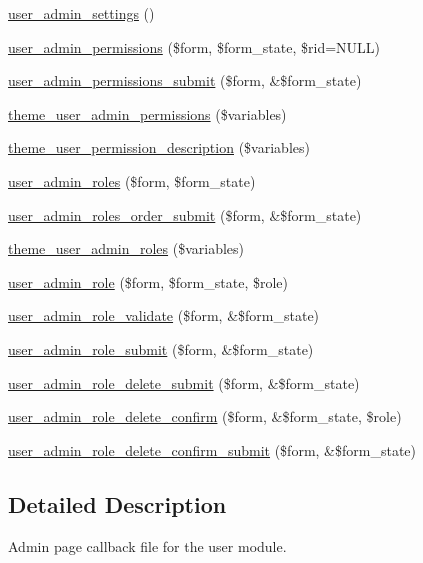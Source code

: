 \begin{DoxyCompactItemize}
\item 
\hyperlink{group__forms_ga8cb1bc70278e0e628fd17c2ec8353bd1}{user\_\-admin\_\-settings} ()
\item 
\hyperlink{group__forms_gabcf8ce0bd54bdce14e7abeea7ed2bad9}{user\_\-admin\_\-permissions} (\$form, \$form\_\-state, \$rid=NULL)
\item 
\hyperlink{user_8admin_8inc_a05efed62d2fe9e10ee50a21b54f6ec31}{user\_\-admin\_\-permissions\_\-submit} (\$form, \&\$form\_\-state)
\item 
\hyperlink{group__themeable_gad8be4d71043b96d113f321c62f457765}{theme\_\-user\_\-admin\_\-permissions} (\$variables)
\item 
\hyperlink{group__themeable_ga459815f84e50a6416f625577c99b9017}{theme\_\-user\_\-permission\_\-description} (\$variables)
\item 
\hyperlink{group__forms_ga80c86a9ecd42e3a8b2518d23cf9b0b84}{user\_\-admin\_\-roles} (\$form, \$form\_\-state)
\item 
\hyperlink{user_8admin_8inc_a572641931024871c1d4fa6a574f20763}{user\_\-admin\_\-roles\_\-order\_\-submit} (\$form, \&\$form\_\-state)
\item 
\hyperlink{group__themeable_gad4ed00385370ab78b0edbc7ec01b729f}{theme\_\-user\_\-admin\_\-roles} (\$variables)
\item 
\hyperlink{group__forms_ga1b97a1d994a0fff5e514d8c0b79b9d9f}{user\_\-admin\_\-role} (\$form, \$form\_\-state, \$role)
\item 
\hyperlink{user_8admin_8inc_ad03d629a48434e2a62448d3ef2dec1bd}{user\_\-admin\_\-role\_\-validate} (\$form, \&\$form\_\-state)
\item 
\hyperlink{user_8admin_8inc_ac85f25cd1c59104fcc4dc4f7b9dfbd2e}{user\_\-admin\_\-role\_\-submit} (\$form, \&\$form\_\-state)
\item 
\hyperlink{user_8admin_8inc_a43838b5335621b4c5d7914b3d4ee34b9}{user\_\-admin\_\-role\_\-delete\_\-submit} (\$form, \&\$form\_\-state)
\item 
\hyperlink{user_8admin_8inc_a3e68f9349198e39b9854f876a7a295fb}{user\_\-admin\_\-role\_\-delete\_\-confirm} (\$form, \&\$form\_\-state, \$role)
\item 
\hyperlink{user_8admin_8inc_ae983d48bc867c0154f4c4af502cefd71}{user\_\-admin\_\-role\_\-delete\_\-confirm\_\-submit} (\$form, \&\$form\_\-state)
\end{DoxyCompactItemize}


\subsection{Detailed Description}
Admin page callback file for the user module. 

